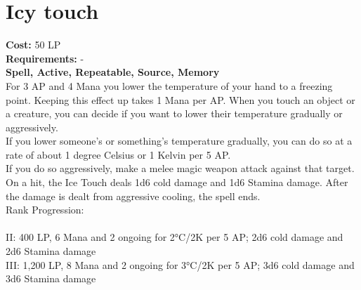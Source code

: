 \section{Icy touch}\label{spell:icyTouch}
\textbf{Cost:} 50 LP\\
\textbf{Requirements:} -\\
\textbf{Spell, Active, Repeatable, Source, Memory}\\
For 3 AP and 4 Mana you lower the temperature of your hand to a freezing point.
Keeping this effect up takes 1 Mana per AP.
When you touch an object or a creature, you can decide if you want to lower their temperature gradually or aggressively.\\
If you lower someone's or something's temperature gradually, you can do so at a rate of about 1 degree Celsius or 1 Kelvin per 5 AP.\\
If you do so aggressively, make a melee magic weapon attack against that target.
On a hit, the Ice Touch deals 1d6 cold damage and 1d6 Stamina damage.
After the damage is dealt from aggressive cooling, the spell ends.
\\
Rank Progression:\\
\\
II: 400 LP, 6 Mana and 2 ongoing for 2°C/2K per 5 AP; 2d6 cold damage and 2d6 Stamina damage\\
III: 1,200 LP, 8 Mana and 2 ongoing for 3°C/2K per 5 AP; 3d6 cold damage and 3d6 Stamina damage\\